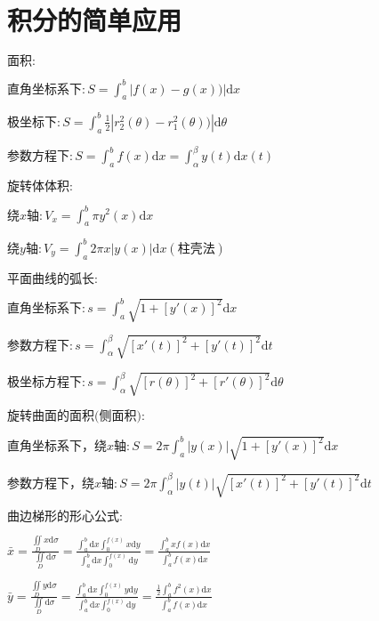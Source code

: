 \section{积分的简单应用}

\begin{spacing}{\hangju}
    \noindent $\mbox{面积}\colon$

    $\displaystyle \mbox{直角坐标系下}\colon S = \int_{a}^{b}{|f(x) - g(x))|\mathrm{d}x}$

    $\displaystyle \mbox{极坐标下}\colon S = \int_{a}^{b}{\frac{1}{2}|r_{2}^{2}(\theta) - r_{1}^{2}(\theta))|\mathrm{d}\theta}$

    $\displaystyle \mbox{参数方程下}\colon S = \int_{a}^{b}{f(x)\mathrm{d}x} =\int_{\alpha}^{\beta}{y(t)\mathrm{d}x(t)}$

    \noindent $\mbox{旋转体体积}\colon$

    $\displaystyle \mbox{绕}x\mbox{轴}\colon V_{x} = \int_{a}^{b}{\pi y^2(x)\mathrm{d}x}$

    $\displaystyle \mbox{绕}y\mbox{轴}\colon V_{y} = \int_{a}^{b}{2\pi x|y(x)|\mathrm{d}x}(\mbox{柱壳法})$

    \noindent $\mbox{平面曲线的弧长}\colon$

    $\displaystyle \mbox{直角坐标系下}\colon s = \int_{a}^{b}{\sqrt{1 + [y'(x)]^2}\mathrm{d}x}$

    $\displaystyle \mbox{参数方程下}\colon s = \int_{\alpha}^{\beta}{\sqrt{[x'(t)]^2 + [y'(t)]^2}\mathrm{d}t}$

    $\displaystyle \mbox{极坐标方程下}\colon s = \int_{\alpha}^{\beta}{\sqrt{[r(\theta)]^2 + [r'(\theta)]^2}\mathrm{d}\theta}$

    \noindent $\mbox{旋转曲面的面积(侧面积)}\colon$

    $\displaystyle \mbox{直角坐标系下，绕}x\mbox{轴}\colon S = 2\pi\int_{a}^{b}{|y(x)|\sqrt{1 + [y'(x)]^2}\mathrm{d}x}$

    $\displaystyle \mbox{参数方程下，绕}x\mbox{轴}\colon S = 2\pi\int_{\alpha}^{\beta}{|y(t)|\sqrt{[x'(t)]^2 + [y'(t)]^2}\mathrm{d}t}$

    \noindent $\mbox{曲边梯形的形心公式}\colon$

    $\displaystyle \bar{x} = \frac{\iint\limits_D{x\mathrm{d}\sigma}}{\iint\limits_D{\mathrm{d}\sigma}} = \frac{\int_{a}^{b}{\mathrm{d}x}\int_{0}^{f(x)}{x\mathrm{d}y}}{\int_{a}^{b}{\mathrm{d}x}\int_{0}^{f(x)}{\mathrm{d}y}} = \frac{\int_{a}^{b}{xf(x)\mathrm{d}x}}{\int_{a}^{b}{f(x)\mathrm{d}x}}$

    $\displaystyle \bar{y} = \frac{\iint\limits_D{y\mathrm{d}\sigma}}{\iint\limits_D{\mathrm{d}\sigma}} = \frac{\int_{a}^{b}{\mathrm{d}x}\int_{0}^{f(x)}{y\mathrm{d}y}}{\int_{a}^{b}{\mathrm{d}x}\int_{0}^{f(x)}{\mathrm{d}y}} = \frac{\frac{1}{2}\int_{a}^{b}{f^{2}(x)\mathrm{d}x}}{\int_{a}^{b}{f(x)\mathrm{d}x}}$


\end{spacing}
